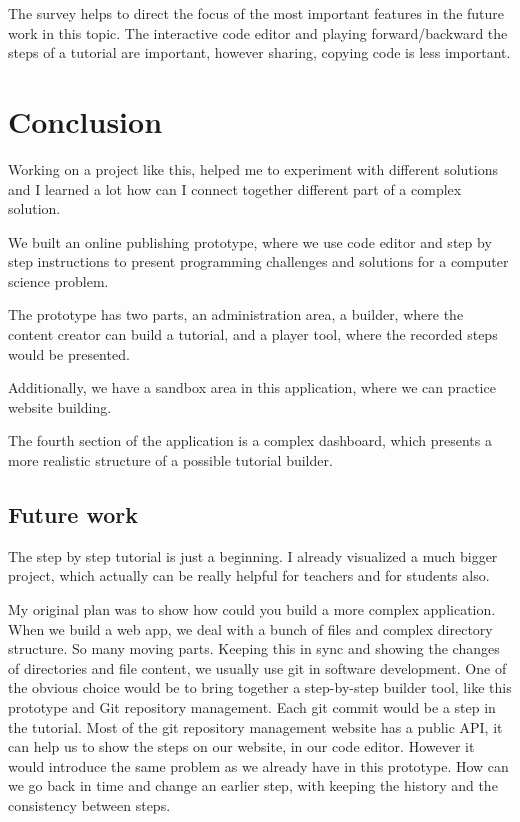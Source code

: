 \documentclass[12pt, a4paper, oneside, openright, medskipamount]{report}
\begin{document}
The survey helps to direct the focus of the most important features in the future work in this topic. The interactive code editor and playing forward/backward the steps of a tutorial are important, however sharing, copying code is less important.

\section{Conclusion}

Working on a project like this, helped me to experiment with different solutions and I learned a lot how can I connect together different part of a complex solution.

We built an online publishing prototype, where we use code editor and step by step instructions to present programming challenges and solutions for a computer science problem.

The prototype has two parts, an administration area, a builder, where the content creator can build a tutorial, and a player tool, where the recorded steps would be presented.

Additionally, we have a sandbox area in this application, where we can practice website building.

The fourth section of the application is a complex dashboard, which presents a more realistic structure of a possible tutorial builder.

\subsection{Future work}

The step by step tutorial is just a beginning. I already visualized a much bigger project, which actually can be really helpful for teachers and for students also.

My original plan was to show how could you build a more complex application. When we build a web app, we deal with a bunch of files and complex directory structure. So many moving parts. Keeping this in sync and showing the changes of directories and file content, we usually use git in software development. One of the obvious choice would be to bring together a step-by-step builder tool, like this prototype and Git repository management. Each git commit would be a step in the tutorial. Most of the git repository management website has a public API, it can help us to show the steps on our website, in our code editor. However it would introduce the same problem as we already have in this prototype. How can we go back in time and change an earlier step, with keeping the history and the consistency between steps.
\end{document}
